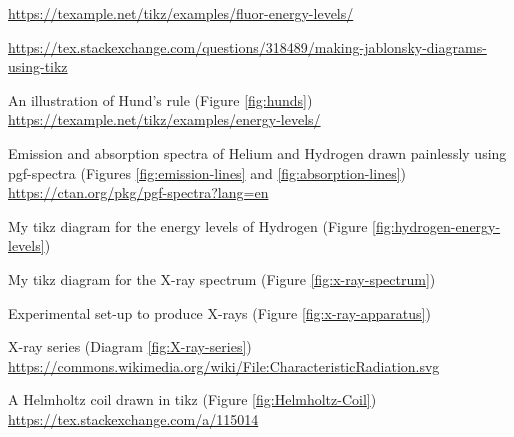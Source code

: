 \begin{enumerate}[label={[\arabic*]}]
    \url{https://texample.net/tikz/examples/fluor-energy-levels/}

    \url{https://tex.stackexchange.com/questions/318489/making-jablonsky-diagrams-using-tikz}
    \item\label{source:hunds} An illustration of Hund's rule (Figure \ref{fig:hunds}) \url{https://texample.net/tikz/examples/energy-levels/}
    \item\label{source:emission-and-absorption-lines} Emission and absorption spectra of Helium and Hydrogen drawn painlessly using pgf-spectra (Figures \ref{fig:emission-lines} and \ref{fig:absorption-lines}) \url{https://ctan.org/pkg/pgf-spectra?lang=en} 
    \item\label{source:hydrogen-energy-levels} My tikz diagram for the energy levels of Hydrogen (Figure \ref{fig:hydrogen-energy-levels})
    \item\label{source:x-ray-spectrum} My tikz diagram for the X-ray spectrum (Figure \ref{fig:x-ray-spectrum})
    \item\label{source:x-ray-apparatus} Experimental set-up to produce X-rays (Figure \ref{fig:x-ray-apparatus})
    \item\label{source:X-ray-series} X-ray series (Diagram \ref{fig:X-ray-series}) \url{https://commons.wikimedia.org/wiki/File:CharacteristicRadiation.svg}
    \item\label{source:Helmholtz-Coil} A Helmholtz coil drawn in tikz (Figure \ref{fig:Helmholtz-Coil}) \url{https://tex.stackexchange.com/a/115014} 
\end{enumerate}